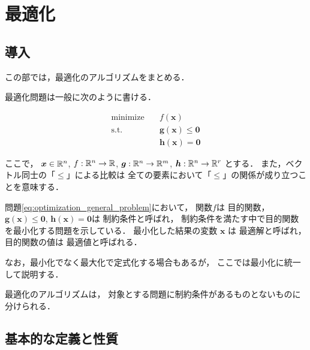 %

\part{最適化}\label{part:optimization}

\chapter{導入}

この部では，最適化のアルゴリズムをまとめる．

最適化問題は一般に次のように書ける．

\begin{equation}
    \begin{aligned}
        \text{minimize} \hspace{1em} & f(\bm{x})                 \\
        \text{s.t.} \hspace{1em}     & \bm{g}(\bm{x}) \le \bm{0} \\
                                     & \bm{h}(\bm{x}) = \bm{0}
    \end{aligned}
    \label{eq:optimization_general_problem}
\end{equation}

ここで，
$\bm{x} \in \mathbb{R}^n$,
$f : \mathbb{R}^n \to \mathbb{R}$,
$\bm{g} : \mathbb{R}^n \to \mathbb{R}^m$,
$\bm{h} : \mathbb{R}^n \to \mathbb{R}^r$
とする．
また，ベクトル同士の「$\le$」による比較は
全ての要素において「$\le$」の関係が成り立つことを意味する．

問題\eqref{eq:optimization_general_problem}において，
関数$f$は  目的関数，
$\bm{g}(\bm{x}) \le \bm{0}$, $\bm{h}(\bm{x}) = \bm{0}$は
 制約条件と呼ばれ，
制約条件を満たす中で目的関数を最小化する問題を示している．
最小化した結果の変数 $\bm{x}$ は  最適解と呼ばれ，
目的関数の値は  最適値と呼ばれる．

なお，最小化でなく最大化で定式化する場合もあるが，
ここでは最小化に統一して説明する．

最適化のアルゴリズムは，
対象とする問題に制約条件があるものとないものに分けられる．

\chapter{基本的な定義と性質}

